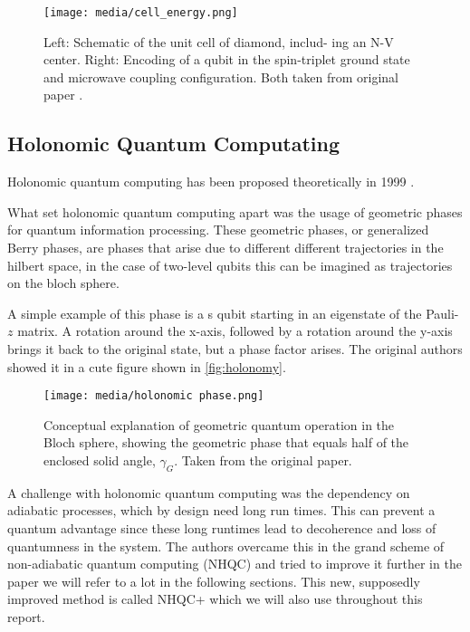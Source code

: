 \documentclass[%
reprint,
amsmath,amssymb,
aps,
]{revtex4-2}
\begin{document}
\begin{figure}
  \centering
  \texttt{[image: media/cell\_energy.png]}
  \caption{Left: Schematic of the unit cell of diamond, includ-
    ing an N-V center. Right: Encoding of a qubit in the spin-triplet
    ground state and microwave coupling conﬁguration. Both taken from original paper
  \cite{PhysRevApplied.16.024060}.}
  \label{fig:NV-center}
\end{figure}

\subsection{Holonomic Quantum Computating}
\label{sec:HQC}
Holonomic quantum computing has been proposed theoretically in 1999 \cite{ZANARDI199994}.

What set holonomic quantum computing apart was the usage of geometric phases for quantum information
processing. These geometric phases, or generalized Berry phases, are phases that arise due to
different different trajectories in the hilbert space, in the case of two-level qubits this can be
imagined as trajectories on the bloch sphere.

A simple example of this phase is a s qubit starting in an eigenstate of the Pauli-$z$ matrix. A
rotation around the x-axis, followed by a rotation around the y-axis brings it back to the original
state, but a phase factor arises. The original authors showed it in a cute figure shown in
\autoref{fig:holonomy}.

\begin{figure}
  \centering
  \texttt{[image: media/holonomic phase.png]}
  \caption{Conceptual explanation of geometric quantum operation in the Bloch
sphere, showing the geometric phase that equals half of the
enclosed solid angle, $\gamma_G$. Taken from the original paper.} 
  \label{fig:holonomy}
\end{figure}

A challenge with holonomic quantum computing was the dependency on adiabatic processes, which by
design need long run times. This can prevent a quantum advantage since these long runtimes lead to
decoherence and loss of quantumness in the system. The authors overcame this in the grand scheme of
non-adiabatic quantum computing (NHQC) and tried to improve it further in the paper we will refer to
a lot in the following sections. This new, supposedly improved method is called NHQC+ which we will
also use throughout this report.
\end{document}
